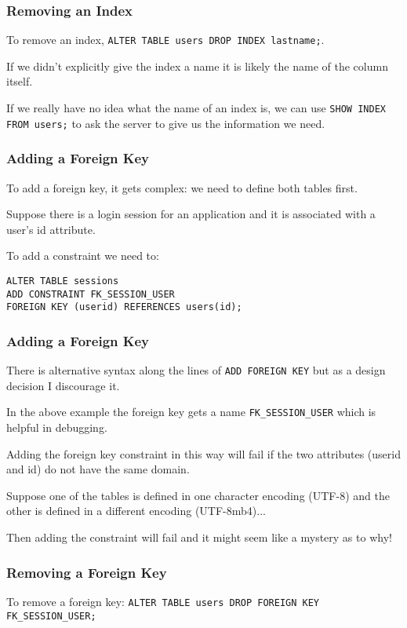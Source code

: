 \begin{frame}
\frametitle{Removing an Index}

To remove an index, \texttt{ALTER TABLE users DROP INDEX lastname;}. 

If we didn't explicitly give the index a name it is likely the name of the column itself. 

If we really have no idea what the name of an index is, we can use \texttt{SHOW INDEX FROM users;} to ask the server to give us the information we need.


\end{frame}

\begin{frame}[fragile]
\frametitle{Adding a Foreign Key}

To add a foreign key, it gets complex: we need to define both tables first. 

Suppose there is a login session for an application and it is associated with a user's id attribute. 

To add a constraint we need to:

\begin{verbatim}
ALTER TABLE sessions
ADD CONSTRAINT FK_SESSION_USER
FOREIGN KEY (userid) REFERENCES users(id);
\end{verbatim}

\end{frame}

\begin{frame}
\frametitle{Adding a Foreign Key}

There is alternative syntax along the lines of \texttt{ADD FOREIGN KEY} but as a design decision I discourage it. 

In the above example the foreign key gets a name \texttt{FK\_SESSION\_USER} which is helpful in debugging. 

Adding the foreign key constraint in this way will fail if the two attributes (userid and id) do not have the same domain. 

Suppose one of the tables is defined in one character encoding (UTF-8) and the other is defined in a different encoding (UTF-8mb4)...

Then adding the constraint will fail and it might seem like a mystery as to why!

\end{frame}

\begin{frame}
\frametitle{Removing a Foreign Key}

To remove a foreign key: \texttt{ALTER TABLE users DROP FOREIGN KEY FK\_SESSION\_USER;}

\end{frame}


